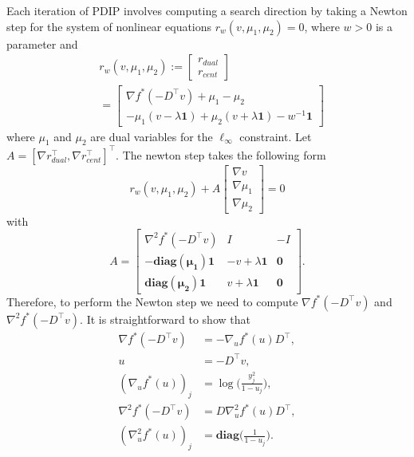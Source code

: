 \documentclass[letterpaper]{article} %
\newcommand{\one}{\mathbf{1}}
\begin{document}
Each iteration of PDIP involves computing a search direction by taking a Newton step for the system of nonlinear equations $r_w(v,\mu_1,\mu_2)=0$, where $w>0$ is a parameter and
\begin{equation}
\begin{aligned}
  &r_w(v,\mu_1,\mu_2)
  :=
	\begin{bmatrix}
	r_{dual}\\
	r_{cent}	
	\end{bmatrix}\\ &=
  \begin{bmatrix}
    \nabla f^*(-D^\top v) + \mu_1 - \mu_2\\
    -\mu_1(v-\lambda\one)+\mu_2(v + \lambda\one) -w^{-1}\one
  \end{bmatrix}
\end{aligned}
\label{eq:resid}
\end{equation}
where $\mu_1$ and $\mu_2$ are dual variables for the $\ell_\infty$ constraint. Let $A=[\nabla r_{dual}^\top , \nabla r_{cent}^\top]^\top$. The newton step takes the following form
\begin{equation}
r_w(v,\mu_1,\mu_2)+A
\begin{bmatrix}
	\nabla v\\
	\nabla \mu_1\\
	\nabla \mu_2	
	\end{bmatrix}= 0
\label{eq:newton_step}
\end{equation}
with
\begin{equation}
A=
\begin{bmatrix}
	\nabla^2 f^*(-D^\top v) & I & -I\\
	-\mathbf{diag(\mu_1)}\one & -v+\lambda\one & \mathbf{0}\\
	\mathbf{diag(\mu_2)}\one & v+\lambda\one & \mathbf{0}
	\end{bmatrix}.
\label{eq:delta_r}
\end{equation}
Therefore, to perform the Newton step we need to compute $\nabla
f^*(-D^\top v)$ and $\nabla^2 f^*(-D^\top v)$. 
It is straightforward to show that
\begin{align}
\nabla f^*(-D^\top v) &=  -\nabla_u f^*(u) D^\top ,\\
u&=-D^\top v, \\
 (\nabla_u f^*(u))_j&=\log\bigg(\frac{y_j^2}{1-u_j}\bigg), \\
\nabla^2 f^*(-D^\top v)&=D\nabla_u^2 f^*(u)D^\top,\\  
(\nabla_u^2 f^*(u))_j&=\mathbf{diag}\bigg(\frac{1}{1-u_j}\bigg).
\end{align}
\end{document}
